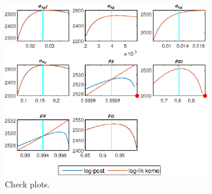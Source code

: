  
\begin{figure}[H]
\centering 
\includegraphics[width=0.80\textwidth]{BRS_fd/graphs/BRS_fd_CheckPlots1}
\caption{Check plots.}\label{Fig:CheckPlots:1}
\end{figure}
 
